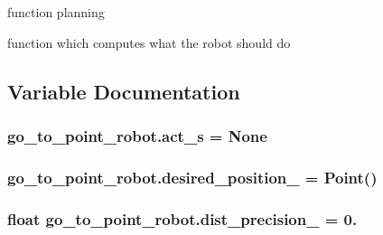 function planning 

function which computes what the robot should do 

\subsection{Variable Documentation}
\subsubsection[{\texorpdfstring{act\+\_\+s}{act_s}}]{\setlength{\rightskip}{0pt plus 5cm}go\+\_\+to\+\_\+point\+\_\+robot.\+act\+\_\+s = None}\hypertarget{namespacego__to__point__robot_ab19ed2eba072e150275e059ca41a4cfc}{}\label{namespacego__to__point__robot_ab19ed2eba072e150275e059ca41a4cfc}
\subsubsection[{\texorpdfstring{desired\+\_\+position\+\_\+}{desired_position_}}]{\setlength{\rightskip}{0pt plus 5cm}go\+\_\+to\+\_\+point\+\_\+robot.\+desired\+\_\+position\+\_\+ = Point()}\hypertarget{namespacego__to__point__robot_ab42eca5c5072ff7b4d95c8e13827dba7}{}\label{namespacego__to__point__robot_ab42eca5c5072ff7b4d95c8e13827dba7}
\subsubsection[{\texorpdfstring{dist\+\_\+precision\+\_\+}{dist_precision_}}]{\setlength{\rightskip}{0pt plus 5cm}float go\+\_\+to\+\_\+point\+\_\+robot.\+dist\+\_\+precision\+\_\+ = 0.}\hypertarget{namespacego__to__point__robot_adce474cb3bcc2782904a1e6129217a4c}{}\label{namespacego__to__point__robot_adce474cb3bcc2782904a1e6129217a4c}
